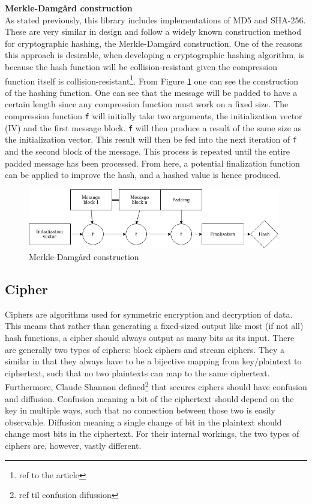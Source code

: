 \documentclass[a4paper, openany]{book}
\begin{document}
\begin{abstact}
\textbf{Merkle-Damgård construction}\\
As stated previously, this library includes implementations of MD5 and SHA-256. These are very similar in design and follow a widely known construction method for cryptographic hashing, the Merkle-Damgård construction. One of the reasons this approach is desirable, when developing a cryptographic hashing algorithm, is because the hash function will be collision-resistant given the compression function itself is collision-resistant\footnote{ref to the article}.
From Figure \ref{fig:Merkle} one can see the construction of the hashing function. One can see that the message will be padded to have a certain length since any compression function must work on a fixed size. The compression function \texttt{f} will initially take two arguments, the initialization vector (IV) and the first message block. \texttt{f} will then produce a result of the same size as the initialization vector. This result will then be fed into the next iteration of \texttt{f} and the second block of the message. This process is repeated until the entire padded message has been processed. From here, a potential finalization function can be applied to improve the hash, and a hashed value is hence produced.

\begin{figure}[H]
\centering
\includegraphics[width=11cm]{merkle.png}
\caption{Merkle-Damgård construction}
\label{fig:Merkle}
\end{figure}
\subsection{Cipher}
\label{sec:org3c293f4}
Ciphers are algorithms used for symmetric encryption and decryption of data. This means that rather than generating a fixed-sized output like most (if not all) hash functions, a cipher should always output as many bits as its input. There are generally two types of ciphers: block ciphers and stream ciphers. They a similar in that they always have to be a bijective mapping from key/plaintext to ciphertext, such that no two plaintexts can map to the same ciphertext. Furthermore, Claude Shannon defined\footnote{ref til confusion difussion} that secures ciphers should have confusion and diffusion. Confusion meaning a bit of the ciphertext should depend on the key in multiple ways, such that no connection between those two is easily observable. Diffusion meaning a single change of bit in the plaintext should change most bits in the ciphertext. For their internal workings, the two types of ciphers are, however, vastly different.\\


\end{abstact}
\end{document}
